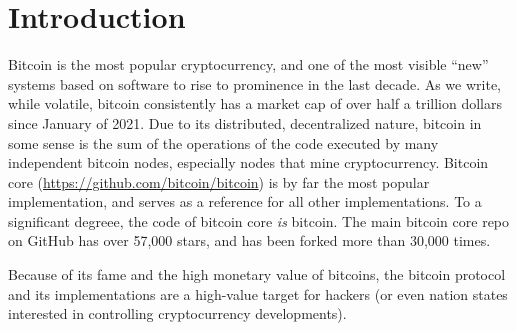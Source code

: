 \section{Introduction}

Bitcoin is the most popular cryptocurrency, and one of the most visible ``new'' systems based on software to rise to prominence in the last decade.  As we write, while volatile, bitcoin consistently has a market cap of over half a trillion dollars since January of 2021.  Due to its distributed, decentralized nature, bitcoin in some sense is the sum of the operations of the code executed by many independent bitcoin nodes, especially nodes that mine cryptocurrency.  Bitcoin core (\url{https://github.com/bitcoin/bitcoin}) is by far the most popular implementation, and serves as a reference for all other implementations.  To a significant degreee, the code of bitcoin core \emph{is} bitcoin.  The main bitcoin core repo on GitHub has over 57,000 stars, and has been forked more than 30,000 times.

Because of its fame and the high monetary value of bitcoins, the bitcoin protocol and its implementations are a high-value target for hackers (or even nation states interested in controlling cryptocurrency developments).